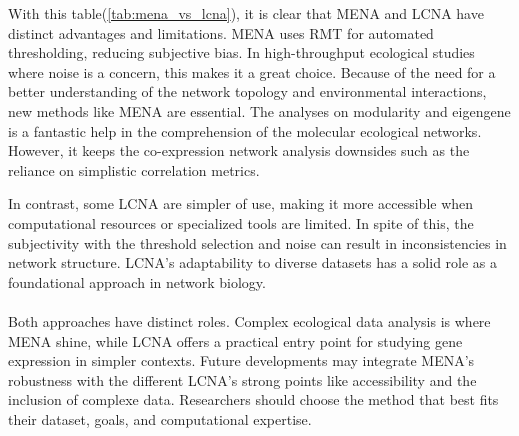 With this table(\autoref{tab:mena_vs_lcna}), it is clear that MENA and LCNA have distinct advantages and limitations.
MENA uses RMT for automated thresholding, reducing subjective bias.
In high-throughput ecological studies where noise is a concern, this makes it a great choice.
Because of the need for a better understanding of the network topology and environmental interactions, new methods like MENA are essential.
The analyses on modularity and eigengene is a fantastic help in the comprehension of the molecular ecological networks.
However, it keeps the co-expression network analysis downsides such as the reliance on simplistic correlation metrics.

\noindent In contrast, some LCNA are simpler of use, making it more accessible when computational resources or specialized tools are limited.
In spite of this, the subjectivity with the threshold selection and noise can result in inconsistencies in network structure.
LCNA’s adaptability to diverse datasets has a solid role as a foundational approach in network biology.
\\\\
Both approaches have distinct roles.
Complex ecological data analysis is where MENA shine, while LCNA offers a practical entry point for studying gene expression in simpler contexts.
Future developments may integrate MENA’s robustness with the different LCNA’s strong points like accessibility and the inclusion of complexe data.
Researchers should choose the method that best fits their dataset, goals, and computational expertise.

